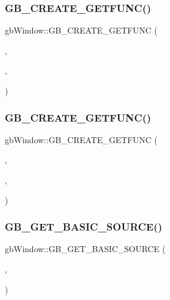 \subsubsection{\texorpdfstring{GB\_CREATE\_GETFUNC()}{GB\_CREATE\_GETFUNC()}\hspace{0.1cm}{\footnotesize\ttfamily [1/2]}}
{\footnotesize\ttfamily gb\+Window\+::\+G\+B\+\_\+\+C\+R\+E\+A\+T\+E\+\_\+\+G\+E\+T\+F\+U\+NC (\begin{DoxyParamCaption}\item[{S\+D\+L\+\_\+\+Renderer $\ast$}]{,  }\item[{Render}]{,  }\item[{\mbox{\hyperlink{classgb_window_a8b83d44addf7721bb1c419dfdcd105ad}{render}}}]{ }\end{DoxyParamCaption})}

\mbox{\label{classgb_window_a4dac120762629bb0a0731950f22a0835}} 
\subsubsection{\texorpdfstring{GB\_CREATE\_GETFUNC()}{GB\_CREATE\_GETFUNC()}\hspace{0.1cm}{\footnotesize\ttfamily [2/2]}}
{\footnotesize\ttfamily gb\+Window\+::\+G\+B\+\_\+\+C\+R\+E\+A\+T\+E\+\_\+\+G\+E\+T\+F\+U\+NC (\begin{DoxyParamCaption}\item[{S\+D\+L\+\_\+\+Texture $\ast$}]{,  }\item[{Canva}]{,  }\item[{\mbox{\hyperlink{classgb_window_a03dded5e834b624a4e026b6c6e298606}{canva}}}]{ }\end{DoxyParamCaption})}

\mbox{\label{classgb_window_a7a24cdcd80201982dca8944b073a76f9}} 
\subsubsection{\texorpdfstring{GB\_GET\_BASIC\_SOURCE()}{GB\_GET\_BASIC\_SOURCE()}}
{\footnotesize\ttfamily gb\+Window\+::\+G\+B\+\_\+\+G\+E\+T\+\_\+\+B\+A\+S\+I\+C\+\_\+\+S\+O\+U\+R\+CE (\begin{DoxyParamCaption}\item[{S\+D\+L\+\_\+\+Window $\ast$}]{,  }\item[{\mbox{\hyperlink{classgb_window_a1faf26696f9974e05cae77fb240a502e}{window}}}]{ }\end{DoxyParamCaption})}

